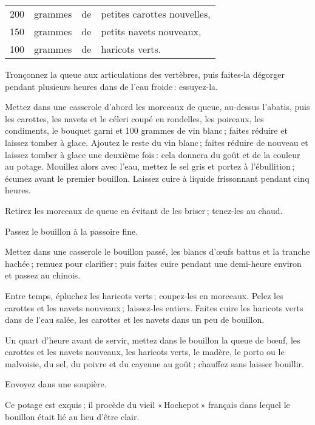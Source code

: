 \footnotesize
\begin{longtable}{rrrp{16em}}
   200 & grammes  & de & petites carottes nouvelles,                                                      \\
   150 & grammes  & de & petits navets nouveaux,                                                          \\
   100 & grammes  & de & haricots verts.                                                                  \\
\end{longtable}
\normalsize 
                
Tronçonnez la queue aux articulations des vertèbres, puis faites-la dégorger
pendant plusieurs heures dans de l’eau froide : essuyez-la.

Mettez dans une casserole d'abord les morceaux de queue, au-dessus l'abatis,
puis les carottes, les navets et le céleri coupé en rondelles, les poireaux,
les condiments, le bouquet garni et 100 grammes de vin blanc ; faites réduire
et laissez tomber à glace. Ajoutez le reste du vin blanc ; faites réduire de
nouveau et laissez tomber à glace une deuxième fois : cela donnera du goût et
de la couleur au potage. Mouillez alors avec l'eau, mettez le sel gris et
portez à l'ébullition ; écumez avant le premier bouillon. Laissez cuire
à liquide frissonnant pendant cinq heures.

Retirez les morceaux de queue en évitant de les briser ; tenez-les au chaud.

Passez le bouillon à la passoire fine.

Mettez dans une casserole le bouillon passé, les blancs d'œufs battus et la tranche
hachée ; remuez pour clarifier ; puis faites cuire pendant une demi-heure environ
et passez au chinois.

Entre temps, épluchez les haricots verts ; coupez-les en morceaux. Pelez les
carottes et les navets nouveaux ; laissez-les entiers. Faites cuire les haricots verts
dans de l’eau salée, les carottes et les navets dans un peu de bouillon.

Un quart d'heure avant de servir, mettez dans le bouillon la queue de bœuf, les
carottes et les navets nouveaux, les haricots verts, le madère, le porto ou le
malvoisie, du sel, du poivre et du cayenne au goût ; chauffez sans laisser
bouillir.

Envoyez dans une soupière.

Ce potage est exquis ; il procède du vieil « Hochepot » français dans lequel le
bouillon était lié au lieu d’être clair.

